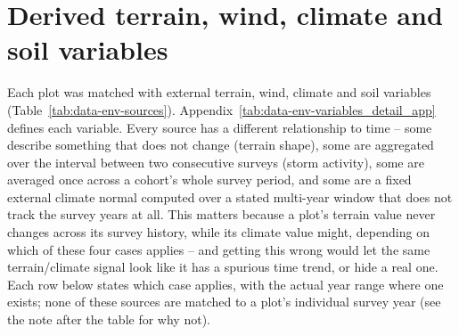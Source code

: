 \documentclass[logo,msc,ai]{infthesis}           %
\begin{document}
\section{Derived terrain, wind, climate and soil variables}
\label{sec:data-environmental}

Each plot was matched with external terrain, wind, climate and soil variables
(Table~\ref{tab:data-env-sources}). Appendix~\ref{tab:data-env-variables_detail_app} defines
each variable. Every source has a different relationship to time -- some describe something
that does not change (terrain shape), some are aggregated over the interval between two
consecutive surveys (storm activity), some are averaged once across a cohort's whole survey
period, and some are a fixed external climate normal computed over a stated multi-year window
that does not track the survey years at all. This matters because a plot's terrain value never
changes across its survey history, while its climate value might, depending on which of these
four cases applies -- and getting this wrong would let the same terrain/climate signal look like
it has a spurious time trend, or hide a real one. Each row below states which case applies, with
the actual year range where one exists; none of these sources are matched to a plot's individual
survey year (see the note after the table for why not).
\end{document}
